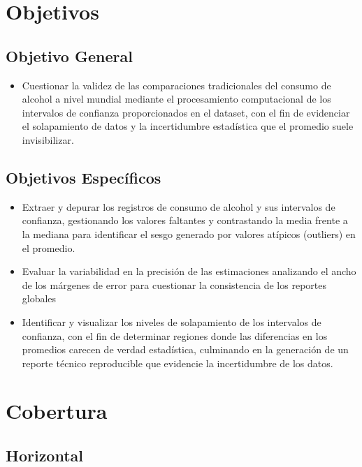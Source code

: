 \documentclass[oneside,11pt]{Latex/Classes/PhDthesisPSnPDF}
\begin{document}
\section{Objetivos}

\subsection{Objetivo General}
\begin{itemize}
  \item{Cuestionar la validez de las comparaciones tradicionales del consumo de alcohol a nivel mundial mediante el procesamiento computacional de los intervalos de confianza proporcionados en el dataset, con el fin de evidenciar el solapamiento de datos y la incertidumbre estadística que el promedio suele invisibilizar.}
\end{itemize}

\subsection{Objetivos Específicos}
\begin{itemize}
  \item{Extraer y depurar los registros de consumo de alcohol y sus intervalos de confianza, gestionando los valores faltantes y contrastando la media frente a la mediana para identificar el sesgo generado por valores atípicos (outliers) en el promedio.}
  \item{Evaluar la variabilidad en la precisión de las estimaciones analizando el ancho de los márgenes de error para cuestionar la consistencia de los reportes globales}
  \item{Identificar y visualizar los niveles de solapamiento de los intervalos de confianza, con el fin de determinar regiones donde las diferencias en los promedios carecen de verdad estadística, culminando en la generación de un reporte técnico reproducible que evidencie la incertidumbre de los datos.}
\end{itemize}

\section{Cobertura}

\subsection{Horizontal}
\end{document}

